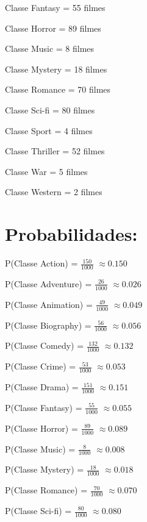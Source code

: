 \documentclass{article}
\begin{document}
Classe Fantasy = 55 filmes \newline

Classe Horror = 89 filmes \newline

Classe Music = 8 filmes \newline

Classe Mystery = 18 filmes \newline

Classe Romance = 70 filmes \newline

Classe  Sci-fi = 80 filmes \newline

Classe Sport = 4 filmes \newline

Classe Thriller = 52 filmes \newline

Classe War = 5 filmes \newline

Classe Western = 2 filmes \newline

\section{Probabilidades:\newline}

P(Classe Action) = $\frac{150}{1000}$ $\approx 0.150$ 

P(Classe Adventure) = $\frac{26}{1000}$ $\approx 0.026$ 

P(Classe Animation) = $\frac{49}{1000}$ $\approx 0.049$ 

P(Classe Biography) = $\frac{56}{1000}$ $\approx 0.056$ 

P(Classe Comedy) = $\frac{132}{1000}$ $\approx 0.132$ 

P(Classe Crime) = $\frac{53}{1000}$ $\approx 0.053$ 

P(Classe Drama) = $\frac{151}{1000}$ $\approx 0.151$ 

P(Classe Fantasy) = $\frac{55}{1000}$ $\approx 0.055$ 

P(Classe Horror) = $\frac{89}{1000}$ $\approx 0.089$  

P(Classe Music) = $\frac{8}{1000}$ $\approx 0.008$ 

P(Classe Mystery) = $\frac{18}{1000}$ $\approx 0.018$

P(Classe Romance) = $\frac{70}{1000}$ $\approx 0.070$ 

P(Classe  Sci-fi) = $\frac{80}{1000}$ $\approx 0.080$ 
\end{document}
